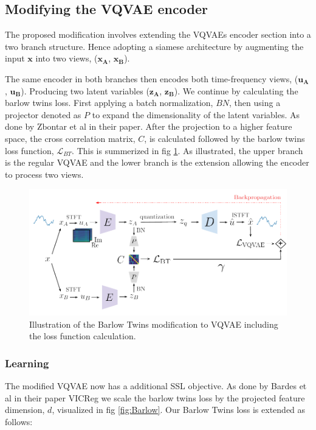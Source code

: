 \subsection{Modifying the VQVAE encoder}
The proposed modification involves extending the VQVAEs encoder section into a two branch structure. Hence adopting a siamese architecture by augmenting 
the input $\mathbf{x}$ into two views, ($\mathbf{x_A}$, $\mathbf{x_B}$).

The same encoder in both branches then encodes both time-frequency views, ($\mathbf{u_A}$, $\mathbf{u_B}$). Producing two latent variables ($\mathbf{z_A}$, $\mathbf{z_B}$). We continue by calculating the barlow twins loss. First applying a batch normalization, $BN$, then using a projector denoted as $P$ to expand the dimensionality of the latent variables. As done by Zbontar et al in their paper\cite{Barlow}.
After the projection to a higher feature space, the cross correlation matrix, $C$, is calculated followed by the barlow twins loss function, $\mathcal{L}_{BT}$. This is summerized in fig \ref{fig:BTVQVAE}. 
As illustrated, the upper branch is the regular VQVAE and the lower branch is the extension allowing the encoder to process two views.

\begin{figure}[H]
    \includegraphics[scale=0.8]{figures/figure-pdf/BarlowTwinsVQVAE.pdf}
    \caption{Illustration of the Barlow Twins modification to VQVAE including the loss function calculation.}
    \label{fig:BTVQVAE}
\end{figure}

\subsubsection{Learning}
The modified VQVAE now has a additional SSL objective. As done by Bardes et al in their paper VICReg\cite{VICReg} we scale the barlow twins loss by the projected feature dimension, $d$, visualized in fig \ref{fig:Barlow}. Our Barlow Twins loss is extended as follows:


